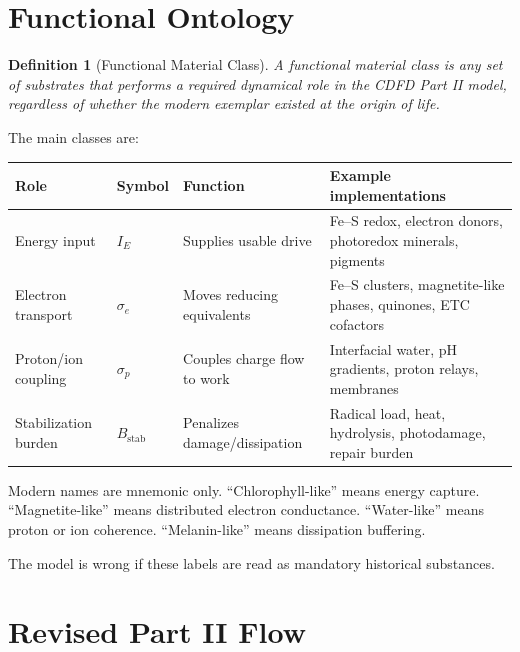 \documentclass[11pt,a4paper]{article}
\newtheorem{definition}{Definition}
\begin{document}
\section{Functional Ontology}

\begin{definition}[Functional Material Class]
A functional material class is any set of substrates that performs a required dynamical role in the CDFD Part II model, regardless of whether the modern exemplar existed at the origin of life.
\end{definition}

The main classes are:
\begin{center}
\small
\begin{tabular}{@{}p{}p{}p{}p{}@{}}
\toprule
Role & Symbol & Function & Example implementations \\
\midrule
Energy input & $I_E$ & Supplies usable drive & Fe--S redox, electron donors, photoredox minerals, pigments \\
Electron transport & $\sigma_e$ & Moves reducing equivalents & Fe--S clusters, magnetite-like phases, quinones, ETC cofactors \\
Proton/ion coupling & $\sigma_p$ & Couples charge flow to work & Interfacial water, pH gradients, proton relays, membranes \\
Stabilization burden & $B_{\mathrm{stab}}$ & Penalizes damage/dissipation & Radical load, heat, hydrolysis, photodamage, repair burden \\
\bottomrule
\end{tabular}
\end{center}

Modern names are mnemonic only. ``Chlorophyll-like'' means energy capture. ``Magnetite-like'' means distributed electron conductance. ``Water-like'' means proton or ion coherence. ``Melanin-like'' means dissipation buffering.

The model is wrong if these labels are read as mandatory historical substances.

\section{Revised Part II Flow}
\end{document}
